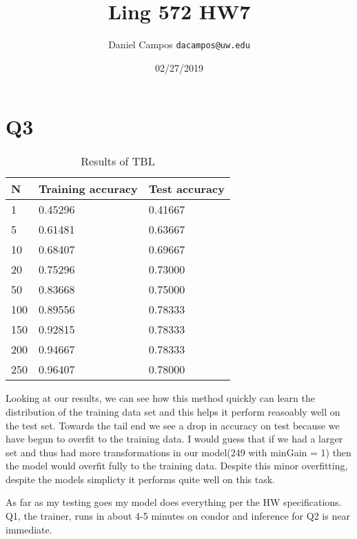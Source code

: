 \documentclass[11pt]{article}
\begin{document}
\title{Ling 572 HW7}
\author{Daniel Campos  \tt {dacampos@uw.edu}}
\date{02/27/2019}
\maketitle 
\section{Q3}
\begin{table}[h]
\centering
\caption{Results of TBL}
\label{table1}
\begin{tabular}{|l|l|l|} \hline
N   & Training accuracy & Test accuracy \\ \hline
1   & 0.45296 & 0.41667 \\ \hline
5   & 0.61481 & 0.63667 \\ \hline
10  & 0.68407 & 0.69667 \\ \hline
20  & 0.75296 & 0.73000 \\ \hline
50  & 0.83668 & 0.75000 \\ \hline
100 & 0.89556 & 0.78333 \\ \hline
150 & 0.92815 & 0.78333 \\ \hline
200 & 0.94667 & 0.78333 \\ \hline
250 & 0.96407 & 0.78000 \\ \hline
\end{tabular}
\end{table}
Looking at our results, we can see how this method quickly can learn the distribution of the training data set and this helps it perform reasoably well on the test set.
Towards the tail end we see a drop in accuracy on test because we have begun to overfit to the training data. I would guess that if we had a larger set and thus had more transformations in our model(249 with minGain = 1) then the model would overfit fully to the training data.
Despite this minor overfitting, despite the models simplicty it performs quite well on this task.

As far as my testing goes my model does everything per the HW specifications. Q1, the trainer, runs in about 4-5 minutes on condor and inference for Q2 is near immediate.
\end{document}
